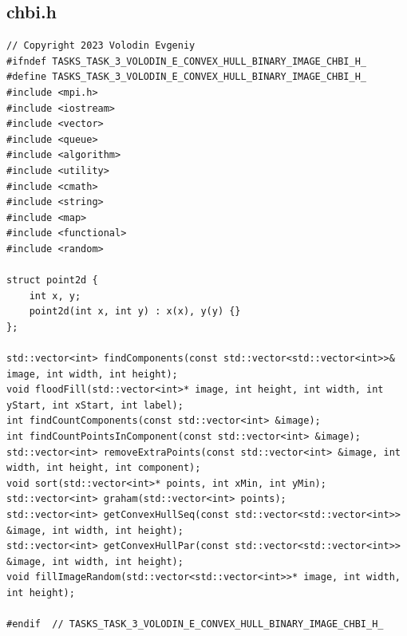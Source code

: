 \documentclass[a4paper, 12pt]{extarticle}
\begin{document}
	\subsection*{chbi.h}
\begin{verbatim}
// Copyright 2023 Volodin Evgeniy
#ifndef TASKS_TASK_3_VOLODIN_E_CONVEX_HULL_BINARY_IMAGE_CHBI_H_
#define TASKS_TASK_3_VOLODIN_E_CONVEX_HULL_BINARY_IMAGE_CHBI_H_
#include <mpi.h>
#include <iostream>
#include <vector>
#include <queue>
#include <algorithm>
#include <utility>
#include <cmath>
#include <string>
#include <map>
#include <functional>
#include <random>

struct point2d {
	int x, y;
	point2d(int x, int y) : x(x), y(y) {}
};

std::vector<int> findComponents(const std::vector<std::vector<int>>& image, int width, int height);
void floodFill(std::vector<int>* image, int height, int width, int yStart, int xStart, int label);
int findCountComponents(const std::vector<int> &image);
int findCountPointsInComponent(const std::vector<int> &image);
std::vector<int> removeExtraPoints(const std::vector<int> &image, int width, int height, int component);
void sort(std::vector<int>* points, int xMin, int yMin);
std::vector<int> graham(std::vector<int> points);
std::vector<int> getConvexHullSeq(const std::vector<std::vector<int>> &image, int width, int height);
std::vector<int> getConvexHullPar(const std::vector<std::vector<int>> &image, int width, int height);
void fillImageRandom(std::vector<std::vector<int>>* image, int width, int height);

#endif  // TASKS_TASK_3_VOLODIN_E_CONVEX_HULL_BINARY_IMAGE_CHBI_H_
\end{verbatim}
\end{document}
